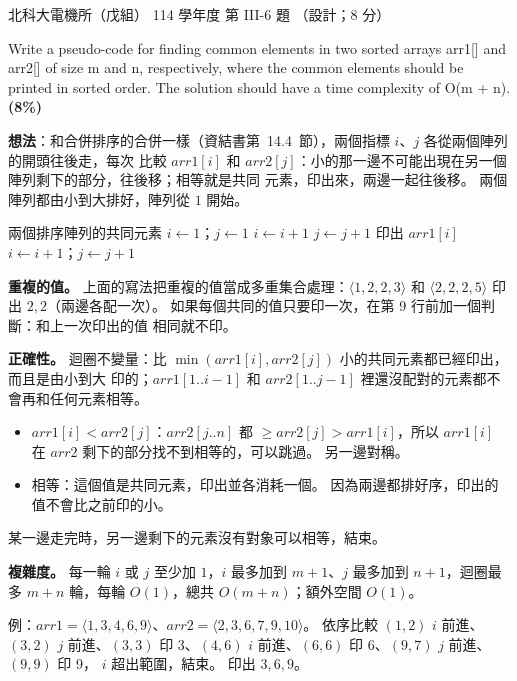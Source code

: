 \begin{pastexam}[label={px:ntut-114-ee-ds-14}]{北科大電機所（戊組） 114 學年度 第 III-6 題}
（設計；8 分）

Write a pseudo-code for finding common elements in two sorted arrays arr1[] and arr2[] of size m and n,
respectively, where the common elements should be printed in sorted order. The solution should have a
time complexity of O(m + n). \textbf{(8\%)}
\end{pastexam}

\begin{pastsoln}
\textbf{想法}：和合併排序的合併一樣（資結書第~14.4~節），兩個指標 $i$、$j$ 各從兩個陣列的開頭往後走，每次
比較 $\mathit{arr1}[i]$ 和 $\mathit{arr2}[j]$：小的那一邊不可能出現在另一個陣列剩下的部分，往後移；相等就是共同
元素，印出來，兩邊一起往後移。 兩個陣列都由小到大排好，陣列從 $1$ 開始。

\begin{pseudo}{兩個排序陣列的共同元素}
    \State $i \gets 1$；$j \gets 1$
            \State $i \gets i + 1$
            \State $j \gets j + 1$
        \Else
            \State 印出 $\mathit{arr1}[i]$
            \State $i \gets i + 1$；$j \gets j + 1$
        \EndIf
    \EndWhile
\EndProcedure
\end{pseudo}

\textbf{重複的值。} 上面的寫法把重複的值當成多重集合處理：$\langle 1, 2, 2, 3 \rangle$ 和 $\langle 2, 2, 2, 5 \rangle$
印出 $2, 2$（兩邊各配一次）。 如果每個共同的值只要印一次，在第 9 行前加一個判斷：和上一次印出的值
相同就不印。

\textbf{正確性。} 迴圈不變量：比 $\min(\mathit{arr1}[i], \mathit{arr2}[j])$ 小的共同元素都已經印出，而且是由小到大
印的；$\mathit{arr1}[1..i-1]$ 和 $\mathit{arr2}[1..j-1]$ 裡還沒配對的元素都不會再和任何元素相等。
\begin{itemize}
\item $\mathit{arr1}[i] < \mathit{arr2}[j]$：$\mathit{arr2}[j..n]$ 都 $\ge \mathit{arr2}[j] > \mathit{arr1}[i]$，所以 $\mathit{arr1}[i]$ 在
$\mathit{arr2}$ 剩下的部分找不到相等的，可以跳過。 另一邊對稱。
\item 相等：這個值是共同元素，印出並各消耗一個。 因為兩邊都排好序，印出的值不會比之前印的小。
\end{itemize}
某一邊走完時，另一邊剩下的元素沒有對象可以相等，結束。

\textbf{複雜度。} 每一輪 $i$ 或 $j$ 至少加 $1$，$i$ 最多加到 $m + 1$、$j$ 最多加到 $n + 1$，迴圈最多 $m + n$ 輪，每輪
$O(1)$，總共 $O(m + n)$；額外空間 $O(1)$。

例：$\mathit{arr1} = \langle 1, 3, 4, 6, 9 \rangle$、$\mathit{arr2} = \langle 2, 3, 6, 7, 9, 10 \rangle$。 依序比較
$(1,2)$ $i$ 前進、$(3,2)$ $j$ 前進、$(3,3)$ 印 3、$(4,6)$ $i$ 前進、$(6,6)$ 印 6、$(9,7)$ $j$ 前進、$(9,9)$ 印 9，
$i$ 超出範圍，結束。 印出 $3, 6, 9$。
\end{pastsoln}
